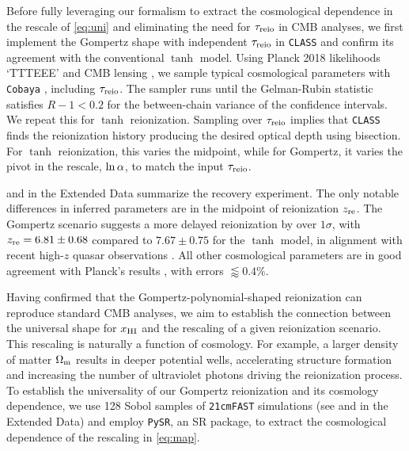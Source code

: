 Before fully leveraging our formalism to extract the cosmological
dependence in the rescale of \cref{eq:uni} and eliminating the
need for $\tau_{\mathrm{reio}}$ in CMB analyses, we first implement the Gompertz
shape with independent $\tau_{\mathrm{reio}}$ in \texttt{CLASS} and confirm its
agreement with the conventional $\tanh$ model.
Using Planck 2018 likelihoods `TTTEEE' \cite{Planck2020c} and CMB
lensing \cite{Planck2020d}, we sample typical cosmological parameters
with \texttt{Cobaya} \cite{Torrado2020}, including $\tau_{\mathrm{reio}}$.
The sampler runs until the Gelman-Rubin statistic \cite{Lewis2013}
satisfies $R - 1 < 0.2$ for the between-chain variance of the confidence
intervals.
We repeat this for $\tanh$ reionization.
Sampling over $\tau_{\mathrm{reio}}$ implies that \texttt{CLASS} finds the
reionization history producing the desired optical depth using
bisection.
For $\tanh$ reionization, this varies the midpoint, while for Gompertz,
it varies the pivot in the rescale, $\ln\alpha$, to match the input
$\tau_{\mathrm{reio}}$.

 and  in the Extended Data summarize the
recovery experiment.
The only notable differences in inferred parameters are in the midpoint
of reionization $z_{\mathrm{re}}$.
The Gompertz scenario suggests a more delayed reionization by over
$1\sigma$, with $z_{\mathrm{re}} = 6.81 \pm 0.68$ compared to $7.67 \pm 0.75$ for
the $\tanh$ model, in alignment with recent high-$z$ quasar observations
\cite{Keating2020}.
All other cosmological parameters are in good agreement with Planck's
results \cite{Planck2020a}, with errors $\lessapprox 0.4 \%$.

Having confirmed that the Gompertz-polynomial-shaped reionization can
reproduce standard CMB analyses,  we aim to establish the connection
between the universal shape for $x_{\mathrm{HI}}$ and the rescaling of a given
reionization scenario.
This rescaling is naturally a function of cosmology.
For example, a larger density of matter $\Omega_\mathrm{m}$ results in deeper
potential wells, accelerating structure formation and increasing the
number of ultraviolet photons driving the reionization process.
To establish the universality of our Gompertz reionization and its
cosmology dependence, we use 128 Sobol samples of \texttt{21cmFAST} simulations
(see  and  in the Extended Data)
and employ \texttt{PySR}, an SR package, to extract the cosmological
dependence of the rescaling in \cref{eq:map}.

